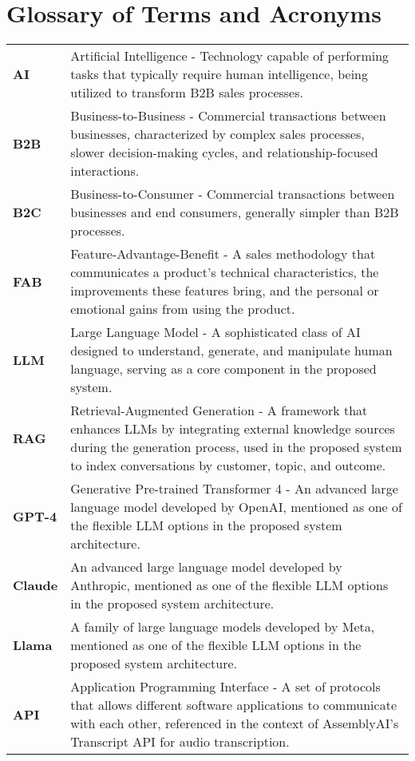 \section{Glossary of Terms and Acronyms}
\vfill
\begin{tabular}{p{1.5cm}p{14cm}}
\textbf{AI} & Artificial Intelligence - Technology capable of performing tasks that typically require human intelligence, being utilized to transform B2B sales processes. \\[0.2cm]

\textbf{B2B} & Business-to-Business - Commercial transactions between businesses, characterized by complex sales processes, slower decision-making cycles, and relationship-focused interactions. \\[0.2cm]

\textbf{B2C} & Business-to-Consumer - Commercial transactions between businesses and end consumers, generally simpler than B2B processes. \\[0.2cm]

\textbf{FAB} & Feature-Advantage-Benefit - A sales methodology that communicates a product's technical characteristics, the improvements these features bring, and the personal or emotional gains from using the product. \\[0.2cm]

\textbf{LLM} & Large Language Model - A sophisticated class of AI designed to understand, generate, and manipulate human language, serving as a core component in the proposed system. \\[0.2cm]

\textbf{RAG} & Retrieval-Augmented Generation - A framework that enhances LLMs by integrating external knowledge sources during the generation process, used in the proposed system to index conversations by customer, topic, and outcome. \\[0.2cm]

\textbf{GPT-4} & Generative Pre-trained Transformer 4 - An advanced large language model developed by OpenAI, mentioned as one of the flexible LLM options in the proposed system architecture. \\[0.2cm]

\textbf{Claude} & An advanced large language model developed by Anthropic, mentioned as one of the flexible LLM options in the proposed system architecture. \\[0.2cm]

\textbf{Llama} & A family of large language models developed by Meta, mentioned as one of the flexible LLM options in the proposed system architecture. \\[0.2cm]

\textbf{API} & Application Programming Interface - A set of protocols that allows different software applications to communicate with each other, referenced in the context of AssemblyAI's Transcript API for audio transcription. \\[0.2cm]
\end{tabular}